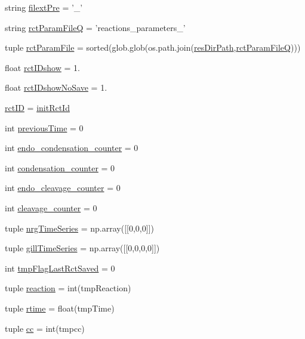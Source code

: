 \begin{DoxyCompactItemize}
\item 
string \hyperlink{a00102_a60ff937c050eef601bd84134d1913d8a}{filext\-Pre} = '\-\_\-'
\item 
string \hyperlink{a00102_aff5ea475bb2c78122a231a915dc88e89}{rct\-Param\-File\-Q} = 'reactions\-\_\-parameters\-\_\-'
\item 
tuple \hyperlink{a00102_ac700504fc38d7684ec9fae104d7d90a3}{rct\-Param\-File} = sorted(glob.\-glob(os.\-path.\-join(\hyperlink{a00102_a9ededb3cd7c63befde39ad68e5f9e006}{res\-Dir\-Path},\hyperlink{a00102_aff5ea475bb2c78122a231a915dc88e89}{rct\-Param\-File\-Q})))
\item 
float \hyperlink{a00102_a8a780c7762bc8a40f296abfd474b7ce4}{rct\-I\-Dshow} = 1.
\item 
float \hyperlink{a00102_a3942b0b71d5893c244f7f49929db336b}{rct\-I\-Dshow\-No\-Save} = 1.
\item 
\hyperlink{a00102_a78ffc7d3b69c53ec5389a151e7fdcb83}{rct\-I\-D} = \hyperlink{a00102_a212643643fc6b002e8797f16633bb16d}{init\-Rct\-Id}
\item 
int \hyperlink{a00102_aff96a31e98ac46cb47a67b74f5d87351}{previous\-Time} = 0
\item 
int \hyperlink{a00102_a20a51ec68106a5a97fb3a72f417ca4e6}{endo\-\_\-condensation\-\_\-counter} = 0
\item 
int \hyperlink{a00102_a144441bdbe6e835849cf165ea2946848}{condensation\-\_\-counter} = 0
\item 
int \hyperlink{a00102_af5702a39b502da88dde8c38417a0efbd}{endo\-\_\-cleavage\-\_\-counter} = 0
\item 
int \hyperlink{a00102_a0dd6730b063ac11ae4620c4a0778f6d9}{cleavage\-\_\-counter} = 0
\item 
tuple \hyperlink{a00102_ad4d4abc783f2f7f8d1084b1144b4fe2f}{nrg\-Time\-Series} = np.\-array(\mbox{[}\mbox{[}0,0,0\mbox{]}\mbox{]})
\item 
tuple \hyperlink{a00102_a99669fe823cebc560b46c3746f9183e7}{gill\-Time\-Series} = np.\-array(\mbox{[}\mbox{[}0,0,0,0\mbox{]}\mbox{]})
\item 
int \hyperlink{a00102_a6e8aff976901d1424dd1ff00c3387014}{tmp\-Flag\-Last\-Rct\-Saved} = 0
\item 
tuple \hyperlink{a00102_a58c3618ec28f27dfbf09e0d3aba05bc7}{reaction} = int(tmp\-Reaction)
\item 
tuple \hyperlink{a00102_a162a08b0497058c76e7e885c03a01336}{rtime} = float(tmp\-Time)
\item 
tuple \hyperlink{a00102_a67fcb77a15f51e94c98bb48b05865715}{cc} = int(tmpcc)

\end{DoxyCompactItemize}
